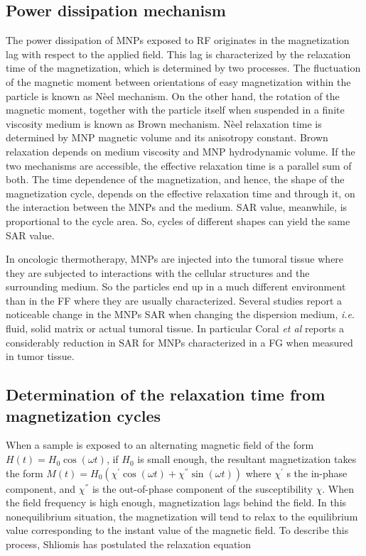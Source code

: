 \documentclass[preprint,12pt]{elsarticle}
\begin{document}
\subsection{Power dissipation mechanism}
The power dissipation of MNPs exposed to RF originates in the magnetization lag with respect to the applied field. This lag is characterized by the relaxation time of the magnetization, which is determined by two processes. The fluctuation of the magnetic moment between  orientations of easy magnetization within the particle is known as Nèel mechanism. On the other hand,  the rotation of the magnetic moment, together with the particle itself when suspended in a finite viscosity medium is known as Brown mechanism. Nèel relaxation time is determined by MNP magnetic volume and its anisotropy constant.  Brown relaxation depends on medium viscosity and MNP hydrodynamic volume. If the two mechanisms are accessible, the effective relaxation time is a parallel sum of both. The time dependence of the magnetization, and hence, the shape of the magnetization cycle, depends on the effective relaxation time and through it, on the interaction between the MNPs and the medium. SAR value, meanwhile, is proportional to the cycle area.\cite{rosensweig2002heating} So, cycles of different shapes can yield the same SAR value.

In oncologic thermotherapy, MNPs are injected into the tumoral tissue where they are subjected to interactions with the cellular structures and the surrounding medium. So the particles end up in a much different environment  than in the FF where they are usually characterized. Several studies report a noticeable change in the MNPs SAR  when changing the dispersion medium, \textit{i.e}. fluid, solid matrix or actual tumoral tissue.\cite{lahiri2017magnetic, rousseau2021influence} In particular Coral \textit{et al} reports a considerably reduction in SAR for MNPs characterized in a FG when measured in tumor tissue.\cite{coral2018nanoclusters} 

\subsection{Determination of the relaxation time from magnetization cycles}
When a sample is exposed to an alternating magnetic field of the form $H(t) = H_0 \cos (\omega t)$, if $H_0$ is small enough, the resultant magnetization takes the form
$M(t)= H_0 (\chi^{'} \cos(\omega t)+\chi^{''} \sin(\omega t))$
where $\chi^{'}$ s the in-phase component, and $\chi^{''}$ is the out-of-phase component of the susceptibility
$\chi$\cite{rosensweig2002heating}. When the field frequency is high enough, magnetization lags behind the field. In this nonequilibrium situation, the magnetization will tend to relax to the equilibrium value corresponding to the instant value of the magnetic ﬁeld. To describe this process, Shliomis\cite{shliomis1974magnetic} has postulated the relaxation equation
\end{document}
